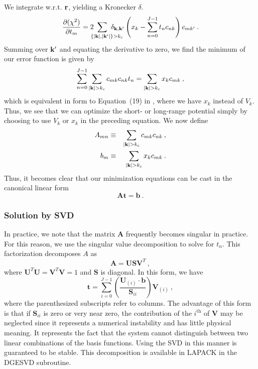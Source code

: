 We integrate w.r.t. $\mathbf{r}$, yielding a Kronecker $\delta$.
\begin{equation}
\frac{\partial (\chi^2)}{\partial t_{m}} =
2 \ns\ns\ns\ns\ns\ns\ns 
\sum_{\ \ \ \ \{|\vk|,|\vk'|\}>k_c} \ns\ns\ns\ns\ns\ns\ns \delta_{\vk, \vk'} 
\left(x_k -\sum_{n=0}^{J-1} t_n c_{nk} \right) c_{mk'}\:.
\end{equation}
Summing over $\mathbf{k}'$ and equating the derivative to zero, we find the
minimum of our error function is given by
\begin{equation}
\sum_{n=0}^{J-1} \sum_{|\vk|>k_c} c_{mk}c_{nk} t_n = 
\sum_{|\vk|>k_c} x_k c_{mk}\:,
\end{equation}
which is equivalent in form to Equation~(19) in \cite{Natoli1995}, where
we have $x_k$ instead of $V_k$.  Thus, we see that we can optimize
the short- or long-range potential simply by choosing to use
$V_k$ or $x_k$ in the preceding equation.  We now define
\begin{eqnarray}
A_{mn} & \equiv & \sum_{|\vk|>k_c} c_{mk} c_{nk}\:, \\
b_{m} & \equiv & \sum_{|\vk|>k_c} x_k c_{mk}\:.
\end{eqnarray}
Thus, it becomes clear that our minimization equations can be cast in
the canonical linear form
\newcommand{\bA}{\mathbf{A}}
\newcommand{\bU}{\mathbf{U}}
\newcommand{\bV}{\mathbf{V}}
\newcommand{\bb}{\mathbf{b}}
\newcommand{\bS}{\mathbf{S}}
\begin{equation}
\bA\mathbf{t} = \mathbf{b}\:.
\end{equation}

\subsubsection{Solution by SVD}
In practice, we note that the matrix $\bA$ frequently becomes singular
in practice.  For this reason, we use the singular value decomposition
to solve for $t_n$.  This factorization decomposes $A$ as
\begin{equation}
\bA = \bU \bS \bV^T\:,
\end{equation}
where $\bU^T\bU = \bV^T\bV = 1$ and $\bS$ is diagonal.  In this form, we have
\begin{equation}
\mathbf{t} = \sum_{i=0}^{J-1} \left( \frac{\bU_{(i)} \cdot
  \bb}{\bS_{ii}} \right) \bV_{(i)}\:,
\end{equation}
where the parenthesized subscripts refer to columns.  The advantage of
this form is that if $\bS_{ii}$ is zero or very near zero, the
contribution of the $i^{\text{th}}$ of $\bV$ may be neglected since
it represents a numerical instability and has little physical
meaning.  It represents the fact that the system cannot distinguish
between two linear combinations of the basis functions.  Using the SVD
in this manner is guaranteed to be stable.  This decomposition is
available in LAPACK in the DGESVD subroutine.

